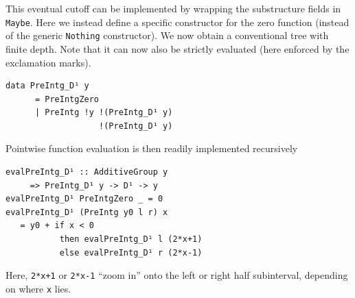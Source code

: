 \documentclass[sigplan,review,anonymous]{acmart}\settopmatter{printfolios=true,printccs=false,printacmref=false}
\theoremstyle{acmplain}
\theoremstyle{acmdefinition}
\begin{document}
This eventual cutoff can be implemented by wrapping the substructure fields in \lstinline`Maybe`.
Here we instead define a specific constructor for the zero function (instead of the generic \lstinline`Nothing` constructor).
We now obtain a conventional tree with finite depth.
Note that it can now also be strictly evaluated (here enforced by the exclamation marks).
\begin{lstlisting}
data PreIntg_D¹ y
      = PreIntgZero
      | PreIntg !y !(PreIntg_D¹ y)
                   !(PreIntg_D¹ y)
\end{lstlisting}
Pointwise function evaluation is then readily implemented recursively
\begin{lstlisting}
evalPreIntg_D¹ :: AdditiveGroup y
     => PreIntg_D¹ y -> D¹ -> y
evalPreIntg_D¹ PreIntgZero _ = 0
evalPreIntg_D¹ (PreIntg y0 l r) x
   = y0 + if x < 0
           then evalPreIntg_D¹ l (2*x+1)
           else evalPreIntg_D¹ r (2*x-1)
\end{lstlisting}
Here, \lstinline`2*x+1` or \lstinline`2*x-1` “zoom in” onto the left or right half subinterval, depending on where \lstinline`x` lies.
\end{document}
